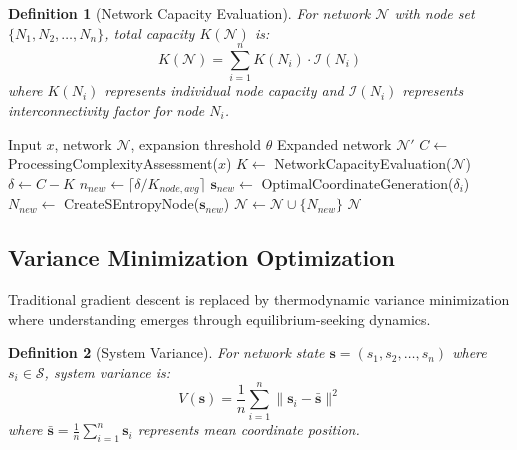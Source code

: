 \documentclass[12pt,a4paper]{article}
\newtheorem{definition}{Definition}
\begin{document}
\begin{definition}[Network Capacity Evaluation]
For network $\mathcal{N}$ with node set $\{N_1, N_2, \ldots, N_n\}$, total capacity $K(\mathcal{N})$ is:
\begin{equation}
K(\mathcal{N}) = \sum_{i=1}^n K(N_i) \cdot \mathcal{I}(N_i)
\end{equation}
where $K(N_i)$ represents individual node capacity and $\mathcal{I}(N_i)$ represents interconnectivity factor for node $N_i$.
\end{definition}

\begin{algorithm}[H]
\caption{Dynamic Network Expansion}
\begin{algorithmic}[1]
\REQUIRE Input $x$, network $\mathcal{N}$, expansion threshold $\theta$
\ENSURE Expanded network $\mathcal{N}'$
\STATE $C \leftarrow$ ProcessingComplexityAssessment($x$)
\STATE $K \leftarrow$ NetworkCapacityEvaluation($\mathcal{N}$)
    \STATE $\delta \leftarrow C - K$ 
    \STATE $n_{new} \leftarrow \lceil \delta / K_{node,avg} \rceil$ 
        \STATE $\mathbf{s}_{new} \leftarrow$ OptimalCoordinateGeneration($\delta_i$)
        \STATE $N_{new} \leftarrow$ CreateSEntropyNode($\mathbf{s}_{new}$)
        \STATE $\mathcal{N} \leftarrow \mathcal{N} \cup \{N_{new}\}$
    \ENDFOR
\ENDIF
\RETURN $\mathcal{N}$
\end{algorithmic}
\end{algorithm}

\subsection{Variance Minimization Optimization}

Traditional gradient descent is replaced by thermodynamic variance minimization where understanding emerges through equilibrium-seeking dynamics.

\begin{definition}[System Variance]
For network state $\mathbf{s} = (s_1, s_2, \ldots, s_n)$ where $s_i \in \mathcal{S}$, system variance is:
\begin{equation}
V(\mathbf{s}) = \frac{1}{n} \sum_{i=1}^n \|\mathbf{s}_i - \bar{\mathbf{s}}\|^2
\end{equation}
where $\bar{\mathbf{s}} = \frac{1}{n}\sum_{i=1}^n \mathbf{s}_i$ represents mean coordinate position.
\end{definition}
\end{document}
